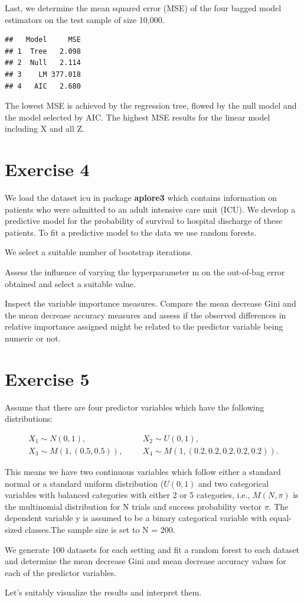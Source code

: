 \documentclass[
]{article}
\begin{document}
Last, we determine the mean squared error (MSE) of the four bagged model
estimators on the test sample of size 10,000.

\begin{verbatim}
##   Model     MSE
## 1  Tree   2.098
## 2  Null   2.114
## 3    LM 377.018
## 4   AIC   2.680
\end{verbatim}

The lowest MSE is achieved by the regression tree, flowed by the null
model and the model selected by AIC. The highest MSE results for the
linear model including X and all Z.

\section{Exercise 4}\label{exercise-4}

We load the dataset icu in package \textbf{aplore3} which contains
information on patients who were admitted to an adult intensive care
unit (ICU). We develop a predictive model for the probability of
survival to hospital discharge of these patients. To fit a predictive
model to the data we use random forests.

We select a suitable number of bootstrap iterations.

Assess the influence of varying the hyperparameter m on the out-of-bag
error obtained and select a suitable value.

Inspect the variable importance measures. Compare the mean decrease Gini
and the mean decrease accuracy measures and assess if the observed
differences in relative importance assigned might be related to the
predictor variable being numeric or not.

\section{Exercise 5}\label{exercise-5}

Assume that there are four predictor variables which have the following
distributions:

\begin{align}
X_1 \sim N(0, 1),&& &X_2 \sim U(0, 1), \\
X_3 \sim M(1, (0.5, 0.5)),&& &X_4 \sim M(1, (0.2, 0.2, 0.2, 0.2, 0.2)).
\end{align}

This means we have two continuous variables which follow either a
standard normal or a standard uniform distribution (\(U(0, 1)\) and two
categorical variables with balanced categories with either 2 or 5
categories, i.e., \(M(N, \pi)\) is the multinomial distribution for N
trials and success probability vector \(\pi\). The dependent variable y
is assumed to be a binary categorical variable with equal-sized
classes.The sample size is set to N = 200.

We generate 100 datasets for each setting and fit a random forest to
each dataset and determine the mean decrease Gini and mean decrease
accuracy values for each of the predictor variables.

Let's suitably visualize the results and interpret them.
\end{document}

